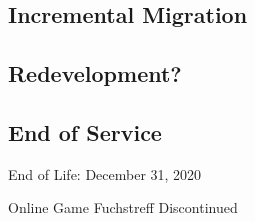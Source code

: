 \subsection{Incremental Migration}

\subsection{Redevelopment?}


\subsection{End of Service}
\begin{frame}{\insertsubsection}
	\begin{fancycolumns}
		\begin{exampletight}{{End of Life: December 31, 2020}}
			\centering{}
		\end{exampletight}
		\nextcolumn
		\begin{exampletight}{Online Game Fuchstreff Discontinued}
		\end{exampletight}
	\end{fancycolumns}
\end{frame}




